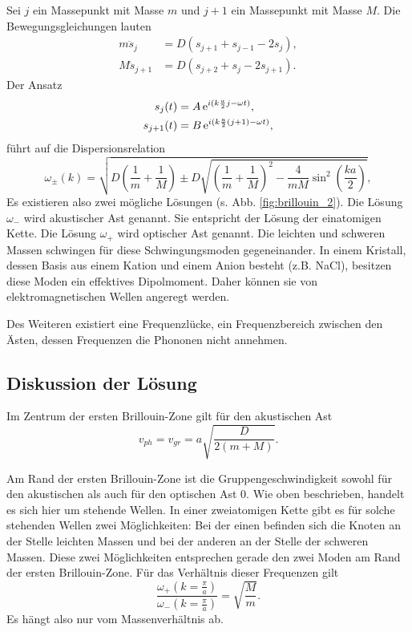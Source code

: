 Sei $j$ ein Massepunkt mit Masse $m$ und $j+1$ ein Massepunkt mit Masse $M$. Die Bewegungsgleichungen lauten
\begin{align}
 m\ddot{s}_{j} &= D\left( s_{j+1} + s_{j-1} -2s_{j} \right), \\
 M\ddot{s}_{j+1} &= D\left( s_{j+2} + s_{j} -2s_{j+1} \right).
\end{align}
Der Ansatz
\begin{align}
 s_{j}(t) &= A \operatorname{e}^{i(k\frac{a}{2}j-\omega t)}, \\
 s_{j+1}(t) &= B \operatorname{e}^{i(k\frac{a}{2}\left(j+1\right)-\omega t)}, \\
\end{align}
führt auf die Dispersionsrelation
\begin{equation}
 \omega_{\pm}\left(k\right) = \sqrt{ D\left(\frac{1}{m}+\frac{1}{M}\right) \pm D\sqrt{ \left(\frac{1}{m}+\frac{1}{M}\right)^{2} -\frac{4}{mM}\sin^{2}\left(\frac{ka}{2}\right) } },
\end{equation}
Es existieren also zwei mögliche Lösungen (s. Abb. \ref{fig:brillouin_2}). Die Lösung $\omega_{-}$ wird akustischer Ast genannt. Sie entspricht der Lösung der einatomigen Kette. Die Lösung $\omega_{+}$ wird optischer Ast genannt. Die leichten und schweren Massen schwingen für diese Schwingungsmoden gegeneinander. In einem Kristall, dessen Basis aus einem Kation und einem Anion besteht (z.B. NaCl), besitzen diese Moden ein effektives Dipolmoment. Daher können sie von elektromagnetischen Wellen angeregt werden.

Des Weiteren existiert eine Frequenzlücke, ein Frequenzbereich zwischen den Ästen, dessen Frequenzen die Phononen nicht annehmen.

\subsection{Diskussion der Lösung}

Im Zentrum der ersten Brillouin-Zone gilt für den akustischen Ast
\begin{equation}
 v_{ph} = v_{gr} = a\sqrt{\frac{D}{2(m+M)}}.
\end{equation}

Am Rand der ersten Brillouin-Zone ist die Gruppengeschwindigkeit sowohl für den akustischen als auch für den optischen Ast $0$. Wie oben beschrieben, handelt es sich hier um stehende Wellen. In einer zweiatomigen Kette gibt es für solche stehenden Wellen zwei Möglichkeiten: Bei der einen befinden sich die Knoten an der Stelle leichten Massen und bei der anderen an der Stelle der schweren Massen. Diese zwei Möglichkeiten entsprechen gerade den zwei Moden am Rand der ersten Brillouin-Zone. Für das Verhältnis dieser Frequenzen gilt
\begin{equation}
 \frac{\omega_{+}\left(k=\frac{\pi}{a}\right)}{\omega_{-}\left(k=\frac{\pi}{a}\right)} = \sqrt{\frac{M}{m}}.
\end{equation}
Es hängt also nur vom Massenverhältnis ab.

